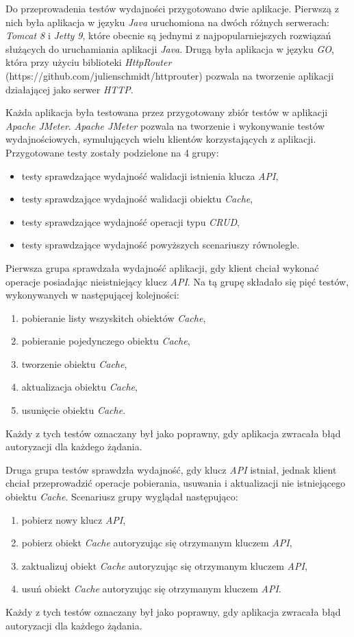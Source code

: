 Do przeprowadenia testów wydajności przygotowano dwie aplikacje. Pierwszą z nich była aplikacja w języku \textsl{Java} uruchomiona na dwóch różnych serwerach: \textsl{Tomcat 8} i \textsl{Jetty 9}, które obecnie są jednymi z najpopularniejszych rozwiązań służących do uruchamiania aplikacji \textsl{Java}. Drugą była aplikacja w języku \textsl{GO}, która przy użyciu biblioteki \textsl{HttpRouter} (https://github.com/julienschmidt/httprouter) pozwala na tworzenie aplikacji działającej jako serwer \textsl{HTTP}.

Każda aplikacja była testowana przez przygotowany zbiór testów w aplikacji \textsl{Apache JMeter}. \textsl{Apache JMeter} pozwala na tworzenie i wykonywanie testów wydajnościowych, symulujących wielu klientów korzystających z aplikacji. Przygotowane testy zostały podzielone na 4 grupy:
\begin{itemize}
    \item testy sprawdzające wydajność walidacji istnienia klucza \textsl{API},
    \item testy sprawdzające wydajność walidacji obiektu \textsl{Cache},
    \item testy sprawdzające wydajność operacji typu \textsl{CRUD},
    \item testy sprawdzające wydajność powyższych scenariuszy równolegle.
\end{itemize}

Pierwsza grupa sprawdzała wydajność aplikacji, gdy klient chciał wykonać operacje posiadając nieistniejący klucz \textsl{API}. Na tą grupę składało się pięć testów, wykonywanych w następującej kolejności:
\begin{enumerate}
    \item pobieranie listy wszyskitch obiektów \textsl{Cache},
    \item pobieranie pojedynczego obiektu \textsl{Cache},
    \item tworzenie obiektu \textsl{Cache},
    \item aktualizacja obiektu \textsl{Cache}, 
    \item usunięcie obiektu \textsl{Cache}.
\end{enumerate}
Każdy z tych testów oznaczany był jako poprawny, gdy aplikacja zwracała błąd autoryzacji dla każdego żądania.

Druga grupa testów sprawdzła wydajność, gdy klucz \textsl{API} istniał, jednak klient chciał przeprowadzić operacje pobierania, usuwania i aktualizacji nie istniejącego obiektu \textsl{Cache}. Scenariusz grupy wyglądał następująco:
\begin{enumerate}
    \item pobierz nowy klucz \textsl{API},
    \item pobierz obiekt \textsl{Cache} autoryzując się otrzymanym kluczem \textsl{API},
    \item zaktualizuj obiekt \textsl{Cache} autoryzując się otrzymanym kluczem \textsl{API},
    \item usuń obiekt \textsl{Cache} autoryzując się otrzymanym kluczem \textsl{API}.
\end{enumerate}
Każdy z tych testów oznaczany był jako poprawny, gdy aplikacja zwracała błąd autoryzacji dla każdego żądania.

